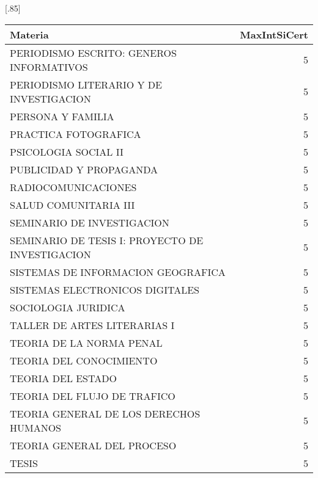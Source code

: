\documentclass[12pt]{article}
\begin{document}
\begin{table}[ht]
\centering
\scalebox{0.75}[.85]{
\begin{tabular}{lr}
  \hline
  Materia & MaxIntSiCert \\ 
  \hline
  PERIODISMO ESCRITO: GENEROS INFORMATIVOS & 5 \\ 
  PERIODISMO LITERARIO Y DE INVESTIGACION & 5 \\ 
  PERSONA Y FAMILIA & 5 \\ 
  PRACTICA FOTOGRAFICA & 5 \\ 
  PSICOLOGIA SOCIAL II & 5 \\ 
  PUBLICIDAD Y PROPAGANDA & 5 \\ 
  RADIOCOMUNICACIONES & 5 \\ 
  SALUD COMUNITARIA III & 5 \\ 
  SEMINARIO DE INVESTIGACION & 5 \\ 
  SEMINARIO DE TESIS I: PROYECTO DE INVESTIGACION & 5 \\ 
  SISTEMAS DE INFORMACION GEOGRAFICA & 5 \\ 
  SISTEMAS ELECTRONICOS DIGITALES & 5 \\ 
  SOCIOLOGIA JURIDICA & 5 \\ 
  TALLER DE ARTES LITERARIAS I & 5 \\ 
  TEORIA DE LA NORMA PENAL & 5 \\ 
  TEORIA DEL CONOCIMIENTO & 5 \\ 
  TEORIA DEL ESTADO & 5 \\ 
  TEORIA DEL FLUJO DE TRAFICO & 5 \\ 
  TEORIA GENERAL DE LOS DERECHOS HUMANOS & 5 \\ 
  TEORIA GENERAL DEL PROCESO & 5 \\ 
  TESIS & 5 \\ 
   \hline
\end{tabular}}
\end{table}
\end{document}
